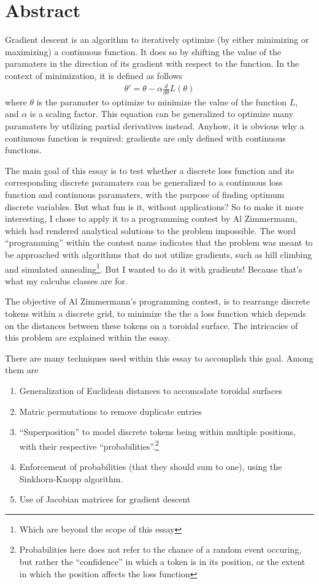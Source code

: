 \section{Abstract}%
\label{sec:abstract}

Gradient descent is an algorithm to iteratively optimize (by either minimizing or maximizing) a continuous function. It does so by shifting the value of the paramaters in the direction of its gradient with respect to the function. In the context of minimization, it is defined as follows
\begin{align*}
         \theta'=\theta-\alpha \frac{d}{d\theta}L(\theta)
\end{align*}
where $\theta$ is the paramater to optimize to minimize the value of the function $L$, and $\alpha$ is a scaling factor. This equation can be generalized to optimize many paramaters by utilizing partial derivatives instead. Anyhow, it is obvious why a continuous function is required: gradients are only defined with continuous functions.

The main goal of this essay is to test whether a discrete loss function and its corresponding discrete paramaters can be generalized to a continuous loss function and continuous paramaters, with the purpose of finding optimum discrete variables. But what fun is it, without applications? So to make it more interesting, I chose to apply it to a programming contest by Al Zimmermann,\cite{zimmermann} which had rendered analytical solutions to the problem impossible. The word ``programming'' within the contest name indicates that the problem was meant to be approached with algorithms that do not utilize gradients, such as hill climbing and simulated annealing\footnote{Which are beyond the scope of this essay}. But I wanted to do it with gradients! Because that's what my calculus classes are for.

The objective of Al Zimmermann's programming contest, is to rearrange discrete tokens within a discrete grid, to minimize the the a loss function which depends on the distances between these tokens on a toroidal surface. The intricacies of this problem are explained within the essay.

There are many techniques used within this essay to accomplish this goal. Among them are
\begin{enumerate}
  \item Generalization of Euclidean distances to accomodate toroidal surfaces
  \item Matric permutations to remove duplicate entries
  \item ``Superposition'' to model discrete tokens being within multiple positions, with their respective ``probabilities''.\footnote{Probabilities here does not refer to the chance of a random event occuring, but rather the ``confidence'' in which a token is in its position, or the extent in which the position affects the loss function}
  \item Enforcement of probabilities (that they should sum to one), using the Sinkhorn-Knopp algorithm.\cite{sinkhorn1967concerning}
  \item Use of Jacobian matrices for gradient descent
\end{enumerate}
